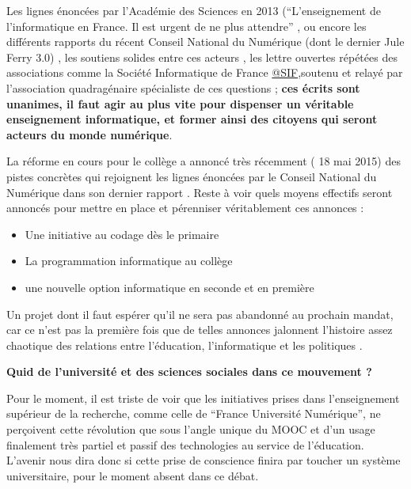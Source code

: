 Les lignes énoncées par l'Académie des Sciences en 2013 (\enquote{L’enseignement de l’informatique en France. Il est urgent de ne plus attendre} \autocite{AScience2013}, ou encore les différents rapports du récent Conseil National du Numérique (dont le dernier Jule Ferry 3.0) \autocite{CNNum2014}, les soutiens solides entre ces acteurs , les lettre ouvertes répétées des associations comme la Société Informatique de France \href{http://www.societe-informatique-de-france.fr/lettre-ouverte-a-monsieur-francois-hollande-president-de-la-republique-concernant-lenseignement-de-linformatique/lettre-ouverte-a-monsieur-francois-hollande-president-de-la-republique-concernant-lenseignement-de-linformatique-2/}{@SIF},soutenu et relayé par l'association quadragénaire spécialiste de ces questions \textcite{EPI2014}; \textbf{ces écrits sont unanimes, il faut agir au plus vite pour dispenser un véritable enseignement informatique, et former ainsi des citoyens qui seront acteurs du monde numérique}.

La réforme en cours pour le collège a annoncé très récemment (\autocite{SIF2015} 18 mai 2015) des pistes concrètes qui rejoignent les lignes énoncées  par le Conseil National du Numérique dans son dernier rapport \autocite{CNNum2014}. Reste à voir quels moyens effectifs seront annoncés pour mettre en place et pérenniser véritablement ces annonces :
\begin{itemize}[label=\textbullet]
\item Une initiative au codage dès le primaire
\item La programmation informatique au collège
\item une nouvelle option informatique en seconde et en première
\end{itemize}

Un projet dont il faut espérer qu'il ne sera pas abandonné au prochain mandat, car ce n'est pas la première fois que de telles annonces jalonnent l'histoire assez chaotique des relations entre l'éducation, l'informatique et les politiques .

\textbf{Quid de l'université et des sciences sociales dans ce mouvement ?}

Pour le moment, il est triste de voir que les initiatives prises dans l'enseignement supérieur de la recherche, comme celle de \enquote{France Université Numérique}, ne perçoivent cette révolution que sous l'angle unique du MOOC et d'un usage finalement très partiel et passif des technologies au service de l'éducation. L'avenir nous dira donc si cette prise de conscience finira par toucher un système universitaire, pour le moment absent dans ce débat.

